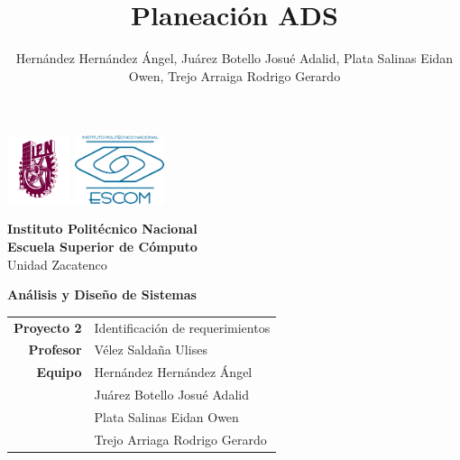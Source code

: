 \documentclass{article}
\author{Hernández Hernández Ángel, Juárez Botello Josué Adalid, Plata Salinas Eidan Owen, Trejo Arraiga Rodrigo Gerardo}
\title{Planeación ADS}
\begin{document}
\begin{titlepage}
	\centering
	\includegraphics[height=2cm]{Logo_IPN.png}
	\hfill
	\includegraphics[height=2cm]{escudoESCOM.png}

	\vspace{-1.5cm}
	\large\textbf{ Instituto Politécnico Nacional}\\
	\large\textbf{Escuela Superior de Cómputo}\\
	\large{Unidad Zacatenco}

	\vspace{2cm}

	\Large{\textbf{Análisis y Diseño de Sistemas}}

	\vspace{10cm}

	\begin{tabular}{rl}
		\textbf{Proyecto 2} & Identificación de requerimientos                    \\
		\textbf{Profesor} & Vélez Saldaña Ulises          \\
		\textbf{Equipo}
		                  & Hernández Hernández Ángel     \\
		                  & Juárez Botello Josué Adalid   \\
		                  & Plata Salinas Eidan Owen      \\
		                  & Trejo Arriaga Rodrigo Gerardo \\
	\end{tabular}
\end{titlepage}

\tableofcontents
\pagebreak
\end{document}
